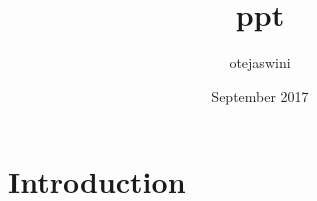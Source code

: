 \documentclass{article}
\title{ppt}
\author{otejaswini }
\date{September 2017}
\begin{document}
\maketitle

\section{Introduction}
\end{document}
